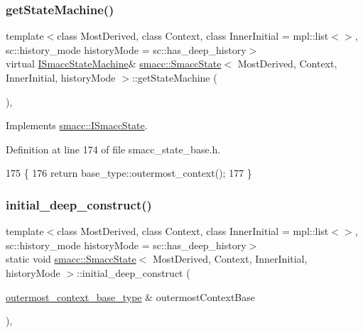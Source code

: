 \subsubsection{\texorpdfstring{get\+State\+Machine()}{getStateMachine()}}
{\footnotesize\ttfamily template$<$class Most\+Derived, class Context, class Inner\+Initial = mpl\+::list$<$$>$, sc\+::history\+\_\+mode history\+Mode = sc\+::has\+\_\+deep\+\_\+history$>$ \\
virtual \hyperlink{classsmacc_1_1ISmaccStateMachine}{I\+Smacc\+State\+Machine}\& \hyperlink{classsmacc_1_1SmaccState}{smacc\+::\+Smacc\+State}$<$ Most\+Derived, Context, Inner\+Initial, history\+Mode $>$\+::get\+State\+Machine (\begin{DoxyParamCaption}{ }\end{DoxyParamCaption})\hspace{0.3cm}{\ttfamily [inline]}, {\ttfamily [virtual]}}



Implements \hyperlink{classsmacc_1_1ISmaccState_a562bb3f9a3ac16b8be71e4794c9e7523}{smacc\+::\+I\+Smacc\+State}.



Definition at line 174 of file smacc\+\_\+state\+\_\+base.\+h.


\begin{DoxyCode}
175     \{
176       \textcolor{keywordflow}{return} base\_type::outermost\_context();
177     \}
\end{DoxyCode}
\mbox{\label{classsmacc_1_1SmaccState_af4b4635d16a32bdd3956e5d40ddbd01d}} 
\subsubsection{\texorpdfstring{initial\+\_\+deep\+\_\+construct()}{initial\_deep\_construct()}}
{\footnotesize\ttfamily template$<$class Most\+Derived, class Context, class Inner\+Initial = mpl\+::list$<$$>$, sc\+::history\+\_\+mode history\+Mode = sc\+::has\+\_\+deep\+\_\+history$>$ \\
static void \hyperlink{classsmacc_1_1SmaccState}{smacc\+::\+Smacc\+State}$<$ Most\+Derived, Context, Inner\+Initial, history\+Mode $>$\+::initial\+\_\+deep\+\_\+construct (\begin{DoxyParamCaption}\item[{\hyperlink{classsmacc_1_1SmaccState_aaf76bbe2aa9dd73e3284605f84ab4b16}{outermost\+\_\+context\+\_\+base\+\_\+type} \&}]{outermost\+Context\+Base }\end{DoxyParamCaption})\hspace{0.3cm}{\ttfamily [inline]}, {\ttfamily [static]}}



